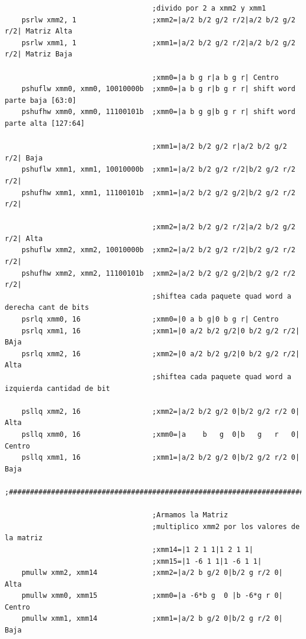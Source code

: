 \begin{codesnippet}
\begin{verbatim}    
                                   ;divido por 2 a xmm2 y xmm1
    psrlw xmm2, 1                  ;xmm2=|a/2 b/2 g/2 r/2|a/2 b/2 g/2 r/2| Matriz Alta
    psrlw xmm1, 1                  ;xmm1=|a/2 b/2 g/2 r/2|a/2 b/2 g/2 r/2| Matriz Baja

                                   ;xmm0=|a b g r|a b g r| Centro
    pshuflw xmm0, xmm0, 10010000b  ;xmm0=|a b g r|b g r r| shift word parte baja [63:0]
    pshufhw xmm0, xmm0, 11100101b  ;xmm0=|a b g g|b g r r| shift word parte alta [127:64]

                                   ;xmm1=|a/2 b/2 g/2 r|a/2 b/2 g/2 r/2| Baja
    pshuflw xmm1, xmm1, 10010000b  ;xmm1=|a/2 b/2 g/2 r/2|b/2 g/2 r/2 r/2| 
    pshufhw xmm1, xmm1, 11100101b  ;xmm1=|a/2 b/2 g/2 g/2|b/2 g/2 r/2 r/2|

                                   ;xmm2=|a/2 b/2 g/2 r/2|a/2 b/2 g/2 r/2| Alta
    pshuflw xmm2, xmm2, 10010000b  ;xmm2=|a/2 b/2 g/2 r/2|b/2 g/2 r/2 r/2|
    pshufhw xmm2, xmm2, 11100101b  ;xmm2=|a/2 b/2 g/2 g/2|b/2 g/2 r/2 r/2|
                                   ;shiftea cada paquete quad word a derecha cant de bits
    psrlq xmm0, 16                 ;xmm0=|0 a b g|0 b g r| Centro
    psrlq xmm1, 16                 ;xmm1=|0 a/2 b/2 g/2|0 b/2 g/2 r/2| BAja
    psrlq xmm2, 16                 ;xmm2=|0 a/2 b/2 g/2|0 b/2 g/2 r/2| Alta
                                   ;shiftea cada paquete quad word a izquierda cantidad de bit

    psllq xmm2, 16                 ;xmm2=|a/2 b/2 g/2 0|b/2 g/2 r/2 0| Alta
    psllq xmm0, 16                 ;xmm0=|a    b   g  0|b   g   r   0| Centro
    psllq xmm1, 16                 ;xmm1=|a/2 b/2 g/2 0|b/2 g/2 r/2 0| Baja

;###########################################################################

								   ;Armamos la Matriz
                                   ;multiplico xmm2 por los valores de la matriz
                                   ;xmm14=|1 2 1 1|1 2 1 1|
                                   ;xmm15=|1 -6 1 1|1 -6 1 1|
    pmullw xmm2, xmm14             ;xmm2=|a/2 b g/2 0|b/2 g r/2 0| Alta
    pmullw xmm0, xmm15			   ;xmm0=|a -6*b g  0 |b -6*g r 0| Centro
    pmullw xmm1, xmm14			   ;xmm1=|a/2 b g/2 0|b/2 g r/2 0| Baja
\end{verbatim}
\end{codesnippet}


